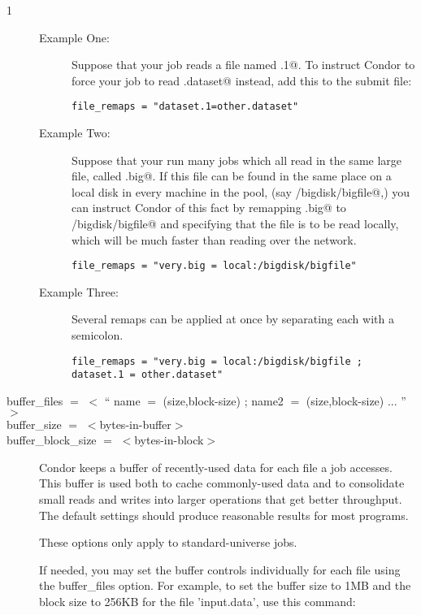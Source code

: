 \begin{ManPage}{\label{man-condor-submit}}{1}
\begin{description}
\begin{description}
\item[Example One:]
Suppose that your job reads a file named \verb@dataset.1@.  To instruct Condor
to force your job to read \verb@other.dataset@ instead, 
add this to the submit file:
\begin{verbatim}
file_remaps = "dataset.1=other.dataset"
\end{verbatim}
\item[Example Two:]
Suppose that your run many jobs which all read in the same large file,
called \verb@very.big@.  If this file can be found in the same place on
a local disk in every machine in the pool,
(say \verb@/bigdisk/bigfile@,) you can
instruct Condor of this fact by remapping \verb@very.big@ to
\verb@/bigdisk/bigfile@ and specifying that the file is to be read locally,
which will be much faster than reading over the network.
\begin{verbatim}
file_remaps = "very.big = local:/bigdisk/bigfile"
\end{verbatim}
\item[Example Three:]
Several remaps can be applied at once by separating each with a semicolon.
\begin{verbatim}
file_remaps = "very.big = local:/bigdisk/bigfile ; dataset.1 = other.dataset"
\end{verbatim}
\end{description}


\item[buffer\_files $=$ $<$ `` name $=$ (size,block-size) ; name2 $=$ (size,block-size) ... '' $>$ ]
\item[buffer\_size $=$ $<$bytes-in-buffer$>$]
\item[buffer\_block\_size $=$ $<$bytes-in-block$>$]
Condor keeps a buffer of recently-used data for each file a job accesses.
This buffer is used both to cache commonly-used data and to consolidate small
reads and writes into larger operations that get better throughput.
The default settings should produce reasonable results for most programs.

These options only apply to standard-universe jobs.

If needed, you may set the buffer controls individually for each file using
the buffer\_files option. For example, to set the buffer size to 1MB and
the block size to 256KB for the file 'input.data', use this command:


\end{description}
\end{ManPage}
